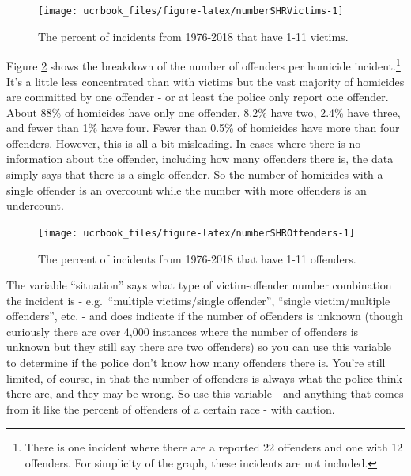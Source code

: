 \documentclass[
  12pt,
  openany]{book}
\begin{document}
\begin{figure}

{\centering \texttt{[image: ucrbook\_files/figure-latex/numberSHRVictims-1]} 

}

\caption{The percent of incidents from 1976-2018 that have 1-11 victims.}\label{fig:numberSHRVictims}
\end{figure}

Figure \ref{fig:numberSHROffenders} shows the breakdown of the number of offenders per homicide incident.\footnote{There is one incident where there are a reported 22 offenders and one with 12 offenders. For simplicity of the graph, these incidents are not included.} It's a little less concentrated than with victims but the vast majority of homicides are committed by one offender - or at least the police only report one offender. About 88\% of homicides have only one offender, 8.2\% have two, 2.4\% have three, and fewer than 1\% have four. Fewer than 0.5\% of homicides have more than four offenders. However, this is all a bit misleading. In cases where there is no information about the offender, including how many offenders there is, the data simply says that there is a single offender. So the number of homicides with a single offender is an overcount while the number with more offenders is an undercount.

\begin{figure}

{\centering \texttt{[image: ucrbook\_files/figure-latex/numberSHROffenders-1]} 

}

\caption{The percent of incidents from 1976-2018 that have 1-11 offenders.}\label{fig:numberSHROffenders}
\end{figure}

The variable ``situation'' says what type of victim-offender number combination the incident is - e.g.~``multiple victims/single offender'', ``single victim/multiple offenders'', etc. - and does indicate if the number of offenders is unknown (though curiously there are over 4,000 instances where the number of offenders is unknown but they still say there are two offenders) so you can use this variable to determine if the police don't know how many offenders there is. You're still limited, of course, in that the number of offenders is always what the police think there are, and they may be wrong. So use this variable - and anything that comes from it like the percent of offenders of a certain race - with caution.
\end{document}

